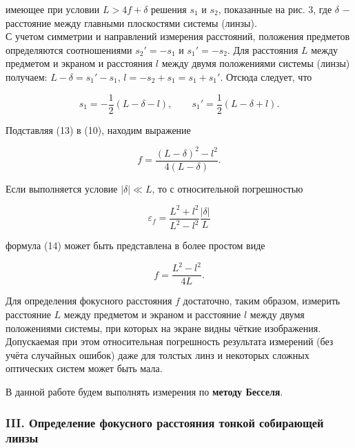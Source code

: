 \documentclass[a4paper,12pt]{article} %
\begin{document}
\hfill \break имеющее при условии $L > 4f + \delta$ решения $s_1$ и $s_2$, показанные на рис. 3, где $\delta$ $-$ расстояние между главными плоскостями системы (линзы).\\

\hfill \break С учетом симметрии и направлений измерения расстояний, положения предметов определяются соотношениями $s_2' = -s_1$ и $s_1' = -s_2$. Для расстояния $L$ между предметом и экраном и расстояния $l$ между двумя положениями системы (линзы) получаем: $L - \delta = s_1' - s_1$, $l = -s_2 + s_1 = s_1 + s_1'$. Отсюда следует, что

\begin{equation}\label{ss}
    s_1 = - \frac{1}{2}(L - \delta - l), \qquad s_1' = \frac{1}{2}(L - \delta + l).
\end{equation}

\hfill \break Подставляя (13) в (10), находим выражение

\begin{equation}\label{4}
    f = \frac{(L - \delta)^2 - l^2}{4(L - \delta)}.
\end{equation}

\hfill \break Если выполняется условие $|\delta| \ll L$, то с относительной погрешностью

\begin{equation*}
    \varepsilon_f = \frac{L^2 + l^2}{L^2 - l^2} \frac{|\delta|}{L}
\end{equation*}

\hfill \break формула (14) может быть представлена в более простом виде

\begin{equation}
    f = \frac{L^2 - l^2}{4L}.
\end{equation}

\hfill \break Для определения фокусного расстояния $f$ достаточно, таким образом, измерить расстояние $L$ между предметом и экраном и расстояние $l$ между двумя положениями системы, при которых на экране видны чёткие изображения. Допускаемая при этом относительная погрешность результата измерений (без учёта случайных ошибок) даже для толстых линз и некоторых сложных оптических систем может быть мала.

\hfill \break В данной работе будем выполнять измерения по \textbf{методу Бесселя}.

\subsubsection*{III. Определение фокусного расстояния тонкой собирающей линзы}
\end{document}
